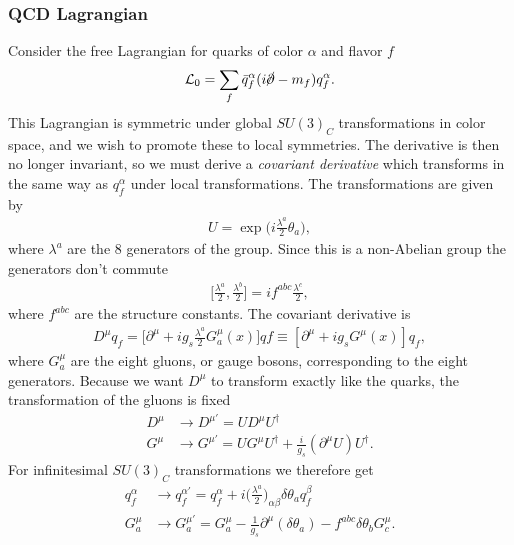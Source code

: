 \documentclass[11pt]{article}
\begin{document}
\begin{multicols}{2}
\subsubsection*{QCD Lagrangian}

\begin{flushleft}
Consider the free Lagrangian for quarks of color $\alpha$ and flavor $f$
\begin{align*}
\mathcal{L}_0 = \sum_f \bar{q}_f^{\alpha} (i \cancel{\partial} - m_f)q_f^{\alpha}.
\end{align*}
This Lagrangian is symmetric under global $SU(3)_C$ transformations in color space, and we wish to promote these to local symmetries. The derivative is then no longer invariant, so we must derive a \textit{covariant derivative} which transforms in the same way as $q_f^{\alpha}$ under local transformations. The transformations are given by
\begin{align*}
U = \exp \Big( i \frac{\lambda^a}{2} \theta_a \Big),
\end{align*}
where $\lambda^a$ are the 8 generators of the group. Since this is a non-Abelian group the generators don't commute
\begin{align*}
\Big[ \frac{\lambda^a}{2}, \frac{\lambda^b}{2}
\Big] = i f^{abc} \frac{\lambda^c}{2},
\end{align*}
where $f^{abc}$ are the structure constants. The covariant derivative is
\begin{align*}
D^{\mu} q_f = \Big[ \partial^{\mu} + ig_s \frac{\lambda^a}{2} G^{\mu}_a (x) \Big] qf \equiv [\partial^{\mu} + ig_s G^{\mu} (x)] q_f,
\end{align*}
where $G^{\mu}_a$ are the eight gluons, or gauge bosons, corresponding to the eight generators. Because we want $D^{\mu}$ to transform exactly like the quarks, the transformation of the gluons is fixed
\begin{align*}
D^{\mu} & \rightarrow D^{\mu '} = U D^{\mu} U^{\dagger}\\
G^{\mu} & \rightarrow G^{\mu '} = U G^{\mu} U^{\dagger} + \frac{i}{g_s} (\partial^{\mu} U) U^{\dagger}.
\end{align*}
For infinitesimal $SU(3)_C$ transformations we therefore get
\begin{align*}
q_f^{\alpha} &\rightarrow q_f^{\alpha '} = q_f^{\alpha} + i \Big( \frac{\lambda^a}{2} \Big)_{\alpha \beta} \delta \theta_a q_f^{\beta}\\
G_a^{\mu} & \rightarrow G_a^{\mu '} = G_a^{\mu} - \frac{1}{g_s} \partial^{\mu} (\delta \theta_a) - f^{abc} \delta \theta_b G_c^{\mu}.
\end{align*}
\end{flushleft}


\end{multicols}
\end{document}
